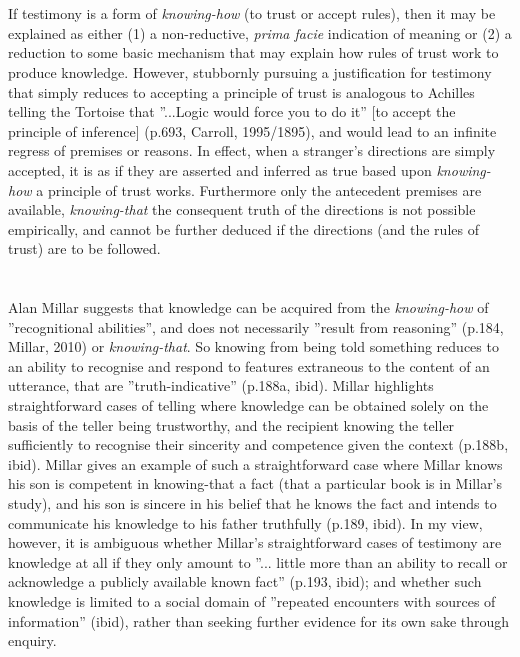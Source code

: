 \documentclass[a4paper, 11pt]{article} %
\begin{document}
\section*{}

If testimony is a form of \textit{knowing-how} (to trust or accept rules), then it may be explained as either (1) a non-reductive, \textit{prima facie} indication of meaning or (2) a reduction to some basic mechanism that may explain how rules of trust work to produce knowledge. However, stubbornly pursuing a justification for testimony that simply reduces to accepting a principle of trust is analogous to Achilles telling the Tortoise that ''...Logic would force you to do it'' [to accept the principle of inference] (p.693, Carroll, 1995/1895)\cite{Carroll:1995}, and would lead to an infinite regress of premises or reasons. In effect, when a stranger's directions are simply accepted, it is as if they are asserted and inferred as true based upon \textit{knowing-how} a principle of trust works. Furthermore only the antecedent premises are available, \textit{knowing-that} the consequent truth of the directions is not possible empirically, and cannot be further deduced if the directions (and the rules of trust) are to be followed.

\section*{}

Alan Millar suggests that knowledge can be acquired from the \textit{knowing-how} of ''recognitional abilities'', and does not necessarily ''result from reasoning'' (p.184, Millar, 2010)\cite{Millar:2010} or \textit{knowing-that}. So knowing from being told something reduces to an ability to recognise and respond to features extraneous to the content of an utterance, that are ''truth-indicative'' (p.188a, ibid)\cite{Millar:2010}. Millar highlights straightforward cases of telling where knowledge can be obtained solely on the basis of the teller being trustworthy, and the recipient knowing the teller sufficiently to recognise their sincerity and competence given the context (p.188b, ibid)\cite{Millar:2010}. Millar gives an example of such a straightforward case where Millar knows his son is competent in knowing-that a fact (that a particular book is in Millar's study), and his son is sincere in his belief that he knows the fact and intends to communicate his knowledge to his father truthfully (p.189, ibid).  In my view, however, it is ambiguous whether Millar's straightforward cases of testimony are knowledge at all if they only amount to ''... little more than an ability to recall or acknowledge a publicly available known fact'' (p.193, ibid)\cite{Millar:2010}; and whether such knowledge is limited to a social domain of ''repeated encounters with sources of information'' (ibid)\cite{Millar:2010}, rather than seeking further evidence for its own sake through enquiry.
\end{document}

